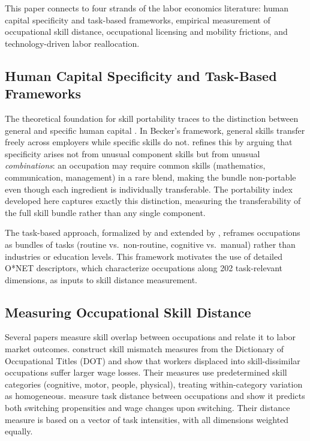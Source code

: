 \documentclass[12pt]{article}
\begin{document}
This paper connects to four strands of the labor economics literature: human capital specificity and task-based frameworks, empirical measurement of occupational skill distance, occupational licensing and mobility frictions, and technology-driven labor reallocation.

\subsection{Human Capital Specificity and Task-Based Frameworks}

The theoretical foundation for skill portability traces to the distinction between general and specific human capital \citep{becker1964}. In Becker's framework, general skills transfer freely across employers while specific skills do not. \citet{lazear2009} refines this by arguing that specificity arises not from unusual component skills but from unusual \emph{combinations}: an occupation may require common skills (mathematics, communication, management) in a rare blend, making the bundle non-portable even though each ingredient is individually transferable. The portability index developed here captures exactly this distinction, measuring the transferability of the full skill bundle rather than any single component.

The task-based approach, formalized by \citet{autor2003} and extended by \citet{acemoglu2011}, reframes occupations as bundles of tasks (routine vs.\ non-routine, cognitive vs.\ manual) rather than industries or education levels. This framework motivates the use of detailed O*NET descriptors, which characterize occupations along 202 task-relevant dimensions, as inputs to skill distance measurement.

\subsection{Measuring Occupational Skill Distance}

Several papers measure skill overlap between occupations and relate it to labor market outcomes. \citet{poletaev2008} construct skill mismatch measures from the Dictionary of Occupational Titles (DOT) and show that workers displaced into skill-dissimilar occupations suffer larger wage losses. Their measures use predetermined skill categories (cognitive, motor, people, physical), treating within-category variation as homogeneous. \citet{gathmann2010} measure task distance between occupations and show it predicts both switching propensities and wage changes upon switching. Their distance measure is based on a vector of task intensities, with all dimensions weighted equally.
\end{document}
